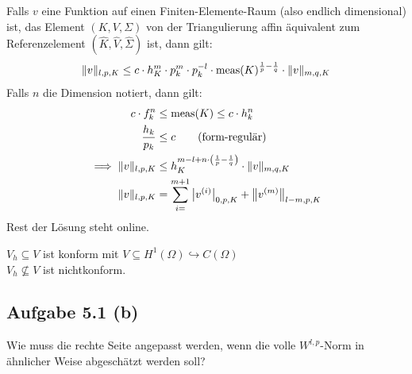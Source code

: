 \documentclass[12pt,a4paper]{article}
\begin{document}
\begin{bemerkung}
Falls $v$ eine Funktion auf einen Finiten-Elemente-Raum (also endlich dimensional) ist, das Element $(K,V,\Sigma)$ von der Triangulierung affin äquivalent zum Referenzelement $(\hat{K},\hat{V},\hat{\Sigma})$ ist, dann gilt:
\begin{align*}
\Vert v\Vert_{l,p,K}\leq c\cdot h_K^m\cdot p_k^m\cdot p_k^{-l}\cdot\operatorname{meas}(K)^{\frac{1}{p}-\frac{1}{q}}\cdot\Vert v\Vert_{m,q,K}
\end{align*}
Falls $n$ die Dimension notiert, dann gilt:
\begin{align*}
c\cdot f_k^n&\leq\operatorname{meas}(K)\leq c\cdot h_k^n\\
\frac{h_k}{p_k}&\leq c\qquad\text{(form-regulär)}\\
\implies\Vert v\Vert_{l,p,K}&\leq h_K^{m-l+n\cdot\left(\frac{1}{p}-\frac{1}{q}\right)}\cdot\Vert v\Vert_{m,q,K}\\
\Vert v\Vert_{l,p,K}&=\sum\limits_{i=}^{m+1}\big| v^{(i)}\big|_{0,p,K}+\big\Vert v^{(m)}\big\Vert_{l-m,p,K}
\end{align*}
Rest der Lösung steht online.
\end{bemerkung}

$V_h\subseteq V$ ist konform mit $V\subseteq H^1(\Omega)\hookrightarrow C(\Omega)$\\
$V_h\not\subseteq V$ ist nichtkonform.

\subsection*{Aufgabe 5.1 (b)}
Wie muss die rechte Seite angepasst werden, wenn die volle $W^{l,p}$-Norm in ähnlicher Weise abgeschätzt werden soll?

\begin{lösung}
\end{lösung}
\end{document}
